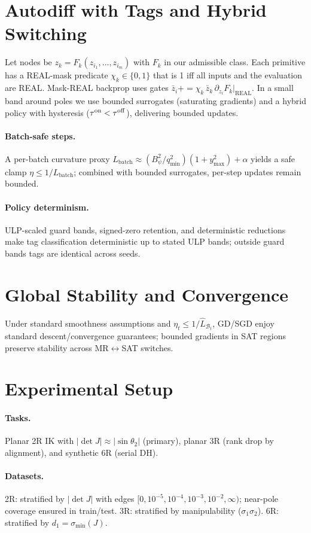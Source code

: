 \documentclass[11pt,twoside]{article}
\begin{document}
\section{Autodiff with Tags and Hybrid Switching}
Let nodes be $z_k=F_k(z_{i_1},\dots,z_{i_m})$ with $F_k$ in our admissible class. Each primitive has a REAL-mask predicate $\chi_k\in\{0,1\}$ that is 1 iff all inputs and the evaluation are REAL. Mask-REAL backprop uses gates $\bar z_i {+}{=} \chi_k\,\bar z_k\,\partial_{z_i}F_k\vert_{\mathrm{REAL}}$. In a small band around poles we use bounded surrogates (saturating gradients) and a hybrid policy with hysteresis ($\tau^{\rm on}<\tau^{\rm off}$), delivering bounded updates.

\paragraph{Batch-safe steps.} A per-batch curvature proxy $L_\mathrm{batch} \approx (B_\psi^2/q_{\min}^2)(1+y_{\max}^2)+\alpha$ yields a safe clamp $\eta\le 1/L_\mathrm{batch}$; combined with bounded surrogates, per-step updates remain bounded.

\paragraph{Policy determinism.} ULP-scaled guard bands, signed-zero retention, and deterministic reductions make tag classification deterministic up to stated ULP bands; outside guard bands tags are identical across seeds.

\section{Global Stability and Convergence}
Under standard smoothness assumptions and $\eta_t\le 1/\widehat L_{\mathcal{B}_t}$, GD/SGD enjoy standard descent/convergence guarantees; bounded gradients in SAT regions preserve stability across MR$\leftrightarrow$SAT switches.

\section{Experimental Setup}
\paragraph{Tasks.} Planar 2R IK with $|\det J|\approx |\sin\theta_2|$ (primary), planar 3R (rank drop by alignment), and synthetic 6R (serial DH).
\paragraph{Datasets.} 2R: stratified by $|\det J|$ with edges $[0,10^{-5},10^{-4},10^{-3},10^{-2},\infty)$; near-pole coverage ensured in train/test. 3R: stratified by manipulability ($\sigma_1\sigma_2$). 6R: stratified by $d_1=\sigma_{\min}(J)$.
\end{document}
